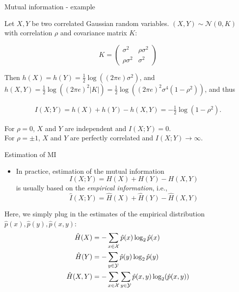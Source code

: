 \documentclass[11pt,compress,t,notes=noshow, xcolor=table]{beamer}
\begin{document}
\begin{vbframe} {Mutual information - example}

Let $X, Y$ be two correlated Gaussian random variables. $(X, Y) \sim \mathcal{N}(0, K)$ with correlation $\rho$ and covariance matrix $K$:

$$
K =
\begin{pmatrix}
  \sigma^2 & \rho \sigma^2 \\
  \rho \sigma^2 & \sigma^2
\end{pmatrix}
$$

Then $h(X) = h(Y) = \frac{1}{2} \log\left((2 \pi e) \sigma^2\right)$, and $h(X,Y) = \frac{1}{2}\log\left((2 \pi e)^2 \vert K\vert\right) = \frac{1}{2}\log\left((2 \pi e)^2 \sigma^4 (1 - \rho^2)\right)$, and thus

\begin{equation*}
\begin{aligned}
I(X;Y) = h(X) + h(Y) - h(X,Y) = -  \frac{1}{2} \log(1 - \rho^2).
\end{aligned}
\end{equation*}

For $\rho = 0$, $X$ and $Y$ are independent and $I(X;Y) = 0$. \\
For $\rho = \pm 1$, $X$ and $Y$ are perfectly correlated and $I(X;Y) \rightarrow \infty$. 
\end{vbframe}

\begin{vbframe}{Estimation of MI}

\begin{itemize}
    \item In practice, estimation of the mutual information $$I(X;Y) = H(X) + H(Y) - H(X,Y)$$ is usually based on the \textit{empirical information}, i.e., $$\hat{I}(X;Y) = \hat{H}(X) + \hat{H}(Y) - \hat{H}(X,Y)$$
\end{itemize}

Here, we simply plug in the estimates of the empirical distribution $\hat{p}(x),\hat{p}(y),\hat{p}(x,y)$:
{\small
\begin{align*}
       \hat{H}(X)&=-\sum_{x \in \mathcal{X}} \hat{p}(x) \log_2 \hat{p}(x)\\
       \hat{H}(Y)&=-\sum_{y \in \mathcal{Y}} \hat{p}(y) \log_2 \hat{p}(y)\\
       \hat{H}(X,Y) &= - \sum_{x \in \mathcal{X}} \sum_{y \in \mathcal{Y}}  \hat{p}(x,y) \log_2(\hat{p}(x,y))\\
\end{align*}
}
\end{vbframe}
\end{document}
